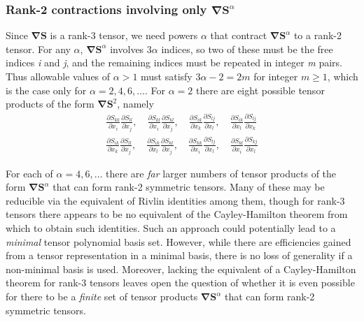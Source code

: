 \subsubsection{Rank-2 contractions involving only $\mathbf{\nabla S}^{\alpha}$}
\label{sec:2C1}

Since  $\mathbf{\nabla S}$ is a rank-3 tensor, we need powers  $\alpha$ that contract $\mathbf{\nabla S}^{\alpha}$  to a rank-2 tensor. For any $\alpha$,  $\mathbf{\nabla S}^{\alpha}$ involves $3\alpha$  indices, so two of these must be the free indices \textit{i} and \textit{j}, and the remaining indices must be repeated in integer \textit{m} pairs. Thus allowable values of  $\alpha > 1$ must satisfy $3\alpha - 2 = 2m$ for integer $m \geq 1$, which is the case only for $\alpha = 2,4,6, \ldots$.  For $\alpha = 2$  there are eight possible tensor products of the form $\mathbf{\nabla S}^{2}$, namely
%
\begin{equation} 
\label{E:32}
\begin{split}
	\frac{\partial S_{kk}}{\partial x_i}\frac{\partial S_{ll}}{\partial x_j}  , \quad
	\frac{\partial S_{kl}}{\partial x_i}\frac{\partial S_{kl}}{\partial x_j}  , \quad
	\frac{\partial S_{ik}}{\partial x_k}\frac{\partial S_{lj}}{\partial x_l}  , \quad
	\frac{\partial S_{ik}}{\partial x_l}\frac{\partial S_{lj}}{\partial x_k}    \\
	\frac{\partial S_{ik}}{\partial x_k}\frac{\partial S_{ll}}{\partial x_j}  , \quad
	\frac{\partial S_{ik}}{\partial x_l}\frac{\partial S_{kl}}{\partial x_j}  , \quad
	\frac{\partial S_{kk}}{\partial x_i}\frac{\partial S_{lj}}{\partial x_l}  , \quad
	\frac{\partial S_{kl}}{\partial x_i}\frac{\partial S_{kj}}{\partial x_l}  
\end{split}
\end{equation}
%
%    

For each of $\alpha = 4,6, \ldots$  there are \textit{far} larger numbers of tensor products of the form $\mathbf{\nabla S}^{\alpha}$ that can form rank-2 symmetric tensors.  Many of these may be reducible via the equivalent of Rivlin identities among them, though for rank-3 tensors there appears to be no equivalent of the Cayley-Hamilton theorem from which to obtain such identities.  Such an approach could potentially lead to a \textit{minimal} tensor polynomial basis set.  However, while there are efficiencies gained from a tensor representation in a minimal basis, there is no loss of generality if a non-minimal basis is used. Moreover, lacking the equivalent of a Cayley-Hamilton theorem for rank-3 tensors leaves open the question of whether it is even possible for there to be a \textit{finite} set of tensor products $\mathbf{\nabla S}^{\alpha}$  that can form rank-2 symmetric tensors. 


